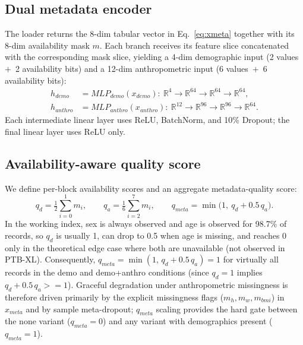 \documentclass[mathematics,article,submit,pdftex]{Definitions/mdpi}
\def\texttt#1{#1}%
\def\mathrm#1{#1}%
\def\mathbf#1{#1}%
\def\geq{>=}%
\begin{document}
\subsection{Dual metadata encoder}
The loader returns the 8-dim tabular vector in Eq.~\eqref{eq:xmeta} together with its 8-dim availability mask $\mathbf{m}$. Each branch receives its feature slice concatenated with the corresponding mask slice, yielding a 4-dim demographic input (2 values~$+$~2 availability bits) and a 12-dim anthropometric input (6 values~$+$~6 availability bits):
\begin{align}
\mathbf{h}_{\mathrm{demo}}   &= \mathrm{MLP}_{\mathrm{demo}}(\mathbf{x}_{\mathrm{demo}}):\ \mathbb{R}^{4}\to\mathbb{R}^{64}\to\mathbb{R}^{64}\to\mathbb{R}^{64}, \\
\mathbf{h}_{\mathrm{anthro}} &= \mathrm{MLP}_{\mathrm{anthro}}(\mathbf{x}_{\mathrm{anthro}}):\ \mathbb{R}^{12}\to\mathbb{R}^{96}\to\mathbb{R}^{96}\to\mathbb{R}^{64}.
\end{align}
Each intermediate linear layer uses ReLU, BatchNorm, and 10\% Dropout; the final linear layer uses ReLU only.

\subsection{Availability-aware quality score}
We define per-block availability scores and an aggregate metadata-quality score:
\begin{equation}\label{eq:qmeta}
q_{d} = \tfrac{1}{2}\sum_{i=0}^{1} m_i, \qquad
q_{a} = \tfrac{1}{6}\sum_{i=2}^{7} m_i, \qquad
q_{\mathrm{meta}} = \min\!\bigl(1,\ q_{d} + 0.5\,q_{a}\bigr).
\end{equation}
In the working index, sex is always observed and age is observed for 98.7\% of records, so $q_d$ is usually 1, can drop to 0.5 when age is missing, and reaches 0 only in the theoretical edge case where both are unavailable (not observed in PTB-XL). Consequently, $q_{\mathrm{meta}} = \min(1,\,q_d + 0.5\,q_a) = 1$ for virtually all records in the \texttt{demo} and \texttt{demo+anthro} conditions (since $q_d{=}1$ implies $q_d + 0.5\,q_a \geq 1$). Graceful degradation under anthropometric missingness is therefore driven primarily by the explicit missingness flags ($m_h, m_w, m_{\mathrm{bmi}}$) in $\mathbf{x}_{\mathrm{meta}}$ and by sample meta-dropout; $q_{\mathrm{meta}}$ scaling provides the hard gate between the \texttt{none} variant ($q_{\mathrm{meta}}{=}0$) and any variant with demographics present ($q_{\mathrm{meta}}{=}1$).
\end{document}
